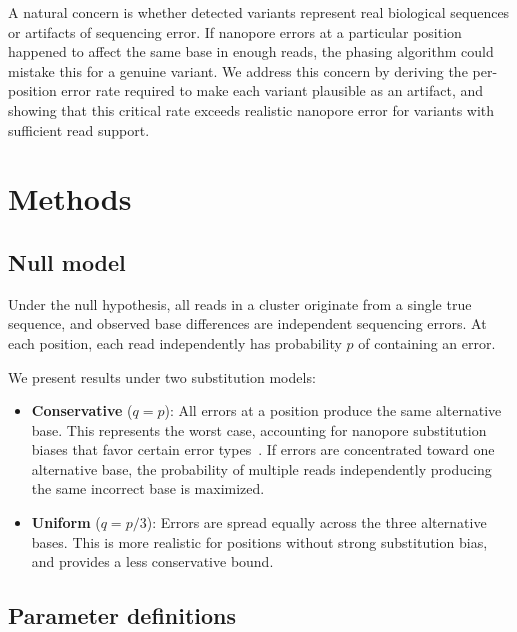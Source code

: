 \documentclass[11pt]{article}
\begin{document}
A natural concern is whether detected variants represent real biological
sequences or artifacts of sequencing error. If nanopore errors at a particular
position happened to affect the same base in enough reads, the phasing algorithm
could mistake this for a genuine variant. We address this concern by deriving the
per-position error rate required to make each variant plausible as an artifact,
and showing that this critical rate exceeds realistic nanopore error for variants
with sufficient read support.

\section{Methods}

\subsection{Null model}

Under the null hypothesis, all reads in a cluster originate from a single true
sequence, and observed base differences are independent sequencing errors. At
each position, each read independently has probability $p$ of containing an
error.

We present results under two substitution models:

\begin{itemize}
\item \textbf{Conservative} ($q = p$): All errors at a position produce the same
alternative base. This represents the worst case, accounting for nanopore
substitution biases that favor certain error types~\cite{delahaye2021,wick2023}. If errors are
concentrated toward one alternative base, the probability of multiple reads
independently producing the same incorrect base is maximized.

\item \textbf{Uniform} ($q = p/3$): Errors are spread equally across the three
alternative bases. This is more realistic for positions without strong substitution
bias, and provides a less conservative bound.
\end{itemize}

\subsection{Parameter definitions}
\end{document}
